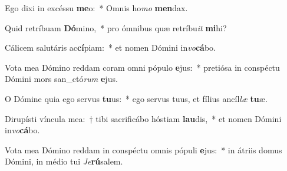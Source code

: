 \item Ego dixi in excéssu \textbf{me}o:~* Omnis ho\textit{mo} \textbf{men}dax.
\item Quid retríbuam \textbf{Dó}mino,~* pro ómnibus quæ retríbu\tinyhspace\textit{it} \textbf{mi}hi?
\item Cálicem salutáris ac\textbf{cí}piam:~* et nomen Dómini in\textit{vo}\textbf{cá}bo.
\item Vota mea Dómino reddam coram omni pópulo \textbf{e}jus:~* pretiósa in conspé\-ctu Dómini mors san\_ctó\textit{rum} \textbf{e}jus.
\item O Dómine quia ego servus \textbf{tu}us:~* ego servus tuus, et fílius ancíl\textit{læ} \textbf{tu}æ.
\item Dirupísti víncula mea:~† tibi sacrificábo hóstiam \textbf{lau}dis,~* et nomen Dómini in\textit{vo}\textbf{cá}bo.
\item Vota mea Dómino reddam in conspéctu omnis pópuli \textbf{e}jus:~* in átriis domus Dómini, in médio tui \tinyhspace\textit{Je}\textbf{rú}salem.
